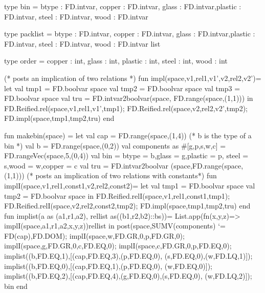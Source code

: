 \documentclass[a4paper]{scrartcl}
\begin{document}
\begin{myverbatim}
type bin = {btype : FD.intvar, copper : FD.intvar, 
            glass : FD.intvar,plastic : FD.intvar,
            steel : FD.intvar, wood : FD.intvar}
                  
type packlist = 
           {btype : FD.intvar, copper : FD.intvar, 
            glass : FD.intvar,plastic : FD.intvar, 
            steel : FD.intvar, wood : FD.intvar} list
       
type order = 
           {copper : int, glass : int, plastic : int,
            steel : int, wood : int}                  

                       
(* posts an implication of two relations *)  
fun impl(space,v1,rel1,v1',v2,rel2,v2')= 
    let
        val tmp1 = FD.boolvar space
        val tmp2 = FD.boolvar space
        val tmp3 = FD.boolvar space
        val tru = FD.intvar2boolvar(space,
                     FD.range(space,(1,1)))
    in
        FD.Reified.rel(space,v1,rel1,v1',tmp1);
        FD.Reified.rel(space,v2,rel2,v2',tmp2);
        FD.impl(space,tmp1,tmp2,tru)
    end
                       
                           
fun makebin(space) =
    let 
        val cap = FD.range(space,(1,4))
       (* b is the type of a bin *)
        val b = FD.range(space,(0,2))
        val components as #[g,p,s,w,c] = 
                       FD.rangeVec(space,5,(0,4))
        val bin = {btype = b,glass = g,plastic = p,
                   steel = s,wood = w,copper = c}
        val tru = FD.intvar2boolvar
                  (space,FD.range(space,(1,1)))
       (* posts an implication of two relations with 
          constants*) 
        fun implI(space,v1,rel1,const1,v2,rel2,const2)= 
            let
                val tmp1 = FD.boolvar space
                val tmp2 = FD.boolvar space
            in
                FD.Reified.relI(space,v1,rel1,const1,tmp1);
                FD.Reified.relI(space,v2,rel2,const2,tmp2);
                FD.impl(space,tmp1,tmp2,tru)
            end
        fun implist(a as (a1,r1,a2),
                    rellist as((b1,r2,b2)::bs))=
                List.app(fn(x,y,z)=> 
                      implI(space,a1,r1,a2,x,y,z))rellist
    in
       post(space,SUMV(components) `= FD(cap),FD.DOM);
       implI(space,w,FD.GR,0,p,FD.GR,0);
       implI(space,g,FD.GR,0,c,FD.EQ,0);
       implI(space,c,FD.GR,0,p,FD.EQ,0);
       implist((b,FD.EQ,1),[(cap,FD.EQ,3),(p,FD.EQ,0),
               (s,FD.EQ,0),(w,FD.LQ,1)]);
       implist((b,FD.EQ,0),[(cap,FD.EQ,1),(p,FD.EQ,0),
               (w,FD.EQ,0)]);
       implist((b,FD.EQ,2),[(cap,FD.EQ,4),(g,FD.EQ,0),(s,FD.EQ,0),
               (w,FD.LQ,2)]);
       bin        
    end    




\end{myverbatim}
\end{document}
